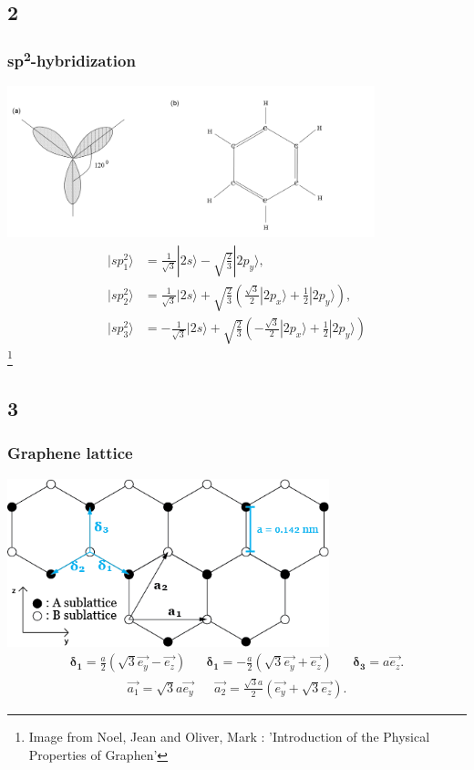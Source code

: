\documentclass{beamer}
\newcommand\blfootnote[1]{%
  \begingroup
  \renewcommand\thefootnote{}\footnote{#1}%
  \addtocounter{footnote}{-1}%
  \endgroup
}
\begin{document}
	\subsection*{2}
		\begin{frame}
			\frametitle{sp\textsuperscript{2}-hybridization}
			\centering
			\includegraphics[width=0.8\textwidth]{figures/carbonHybridization2.png}
			\begin{align}
				| sp_1^2 \rangle &= \tfrac{1}{\sqrt{3}} | 2s \rangle - \sqrt{\tfrac{2}{3}} | 2p_y \rangle, \\
				| sp_2^2 \rangle &= \tfrac{1}{\sqrt{3}} | 2s \rangle + \sqrt{\tfrac{2}{3}} (\tfrac{\sqrt{3}}{2} |2 p_x \rangle + \tfrac{1}{2} | 2p_y \rangle), \\
				|sp_3^2 \rangle &= - \tfrac{1}{\sqrt{3}} | 2s \rangle + \sqrt{\tfrac{2}{3}} ( - \tfrac{\sqrt{3}}{2} | 2p_x \rangle + \tfrac{1}{2} | 2 p_y \rangle)
			\end{align}	
			\blfootnote{Image from Noel, Jean and Oliver, Mark : 'Introduction of the Physical Properties of Graphen' }		
		\end{frame}

	\subsection*{3}
		\begin{frame}
			\frametitle{Graphene lattice}
			\centering
			\includegraphics[width=0.7\textwidth]{figures/grapheneLattice.png}
			\begin{align}
				\boldsymbol{\delta_1} = \frac{a}{2} (\sqrt{3} \vec{e_y} - \vec{e_z}) && \boldsymbol{\delta_1} = - \frac{a}{2} (\sqrt{3} \vec{e_y} + \vec{e_z}) && \boldsymbol{\delta_3} = a \vec{e_z}.
			\end{align}
			\begin{align}
				\vec{a_1} = \sqrt{3} a \vec{e_y} && \vec{a_2} =  \frac{\sqrt{3}a}{2} (\vec{e_y} + \sqrt{3} \vec{e_z}).
			\end{align}			
		\end{frame}
\end{document}
